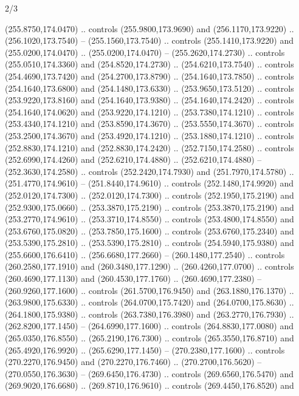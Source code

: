 \begin{flagdescription}{2/3}
\begin{scope}[xshift=0.5\flaglength,yshift=0.5\flagwidth,scale=\flagwidth/259.2]
\begin{scope}[y=0.8pt, x=0.8pt, yscale=-1,shift={(-243,-162)}]
      (255.8750,174.0470) .. controls (255.9800,173.9690) and (256.1170,173.9220) ..
      (256.1020,173.7540) -- (255.1560,173.7540) .. controls (255.1410,173.9220) and
      (255.0200,174.0470) .. (255.0200,174.0470) -- (255.2620,174.2730) .. controls
      (255.0510,174.3360) and (254.8520,174.2730) .. (254.6210,173.7540) .. controls
      (254.4690,173.7420) and (254.2700,173.8790) .. (254.1640,173.7850) .. controls
      (254.1640,173.6800) and (254.1480,173.6330) .. (253.9650,173.5120) .. controls
      (253.9220,173.8160) and (254.1640,173.9380) .. (254.1640,174.2420) .. controls
      (254.1640,174.0620) and (253.9220,174.1210) .. (253.7380,174.1210) .. controls
      (253.4340,174.1210) and (253.8590,174.3670) .. (253.5550,174.3670) .. controls
      (253.2500,174.3670) and (253.4920,174.1210) .. (253.1880,174.1210) .. controls
      (252.8830,174.1210) and (252.8830,174.2420) .. (252.7150,174.2580) .. controls
      (252.6990,174.4260) and (252.6210,174.4880) .. (252.6210,174.4880) --
      (252.3630,174.2580) .. controls (252.2420,174.7930) and (251.7970,174.5780) ..
      (251.4770,174.9610) -- (251.8440,174.9610) .. controls (252.1480,174.9920) and
      (252.0120,174.7300) .. (252.0120,174.7300) .. controls (252.1950,175.2190) and
      (252.9300,175.0660) .. (253.3870,175.2190) .. controls (253.3870,175.2190) and
      (253.2770,174.9610) .. (253.3710,174.8550) .. controls (253.4800,174.8550) and
      (253.6760,175.0820) .. (253.7850,175.1600) .. controls (253.6760,175.2340) and
      (253.5390,175.2810) .. (253.5390,175.2810) .. controls (254.5940,175.9380) and
      (255.6600,176.6410) .. (256.6680,177.2660) -- (260.1480,177.2540) .. controls
      (260.2580,177.1910) and (260.3480,177.1290) .. (260.4260,177.0700) .. controls
      (260.4690,177.1130) and (260.4530,177.1760) .. (260.4690,177.2380) --
      (260.9260,177.1600) .. controls (261.5700,176.9450) and (263.1880,176.1370) ..
      (263.9800,175.6330) .. controls (264.0700,175.7420) and (264.0700,175.8630) ..
      (264.1800,175.9380) .. controls (263.7380,176.3980) and (263.2770,176.7930) ..
      (262.8200,177.1450) -- (264.6990,177.1600) .. controls (264.8830,177.0080) and
      (265.0350,176.8550) .. (265.2190,176.7300) .. controls (265.3550,176.8710) and
      (265.4920,176.9920) .. (265.6290,177.1450) -- (270.2380,177.1600) .. controls
      (270.2270,176.9450) and (270.2270,176.7460) .. (270.2700,176.5620) --
      (270.0550,176.3630) -- (269.6450,176.4730) .. controls (269.6560,176.5470) and
      (269.9020,176.6680) .. (269.8710,176.9610) .. controls (269.4450,176.8520) and

\end{scope}
\end{scope}
\end{flagdescription}
